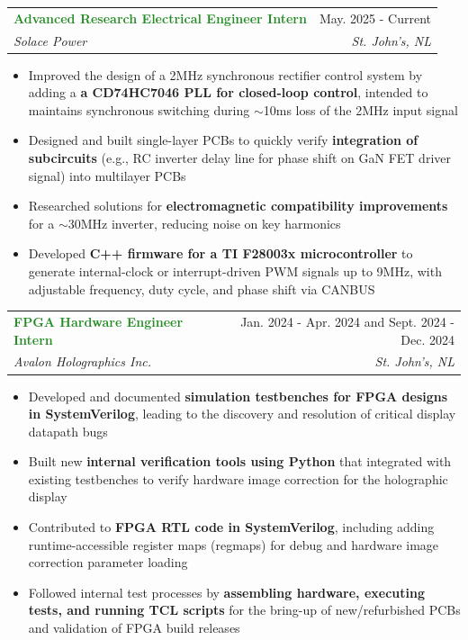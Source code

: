 \documentclass[letterpaper,11pt]{article}
\makeatletter
\newcommand{\resumeItem}[1]{
  \item\small{
    {#1 \vspace{-2pt}}
  }
}
\newcommand{\resumeSubheading}[4]{
  \vspace{-2pt}\item
    \begin{tabular*}{0.97\textwidth}[t]{l@{\extracolsep{\fill}}r}
      \textbf{\textcolor{ForestGreen}{#1}} & #2 \\
      \textit{\small#3} & \textit{\small #4} \\
    \end{tabular*}\vspace{-7pt}
}
\newcommand{\resumeItemListStart}{\begin{itemize}}
\newcommand{\resumeItemListEnd}{\end{itemize}\vspace{-5pt}}
\makeatother
\begin{document}
    \resumeSubheading
      {Advanced Research Electrical Engineer Intern}{May. 2025 - Current}
      {Solace Power}{St. John's, NL}
      \resumeItemListStart
        \resumeItem{Improved the design of a 2MHz synchronous rectifier control system by adding a \textbf{a CD74HC7046 PLL for closed-loop control}, intended to maintains synchronous 
        switching during \(\sim \)10ms loss of the 2MHz input signal}
        \resumeItem{Designed and built single-layer PCBs to quickly verify \textbf{integration of subcircuits} (e.g., RC inverter delay line for phase shift on GaN FET driver signal) into multilayer PCBs}
        \resumeItem{Researched solutions for \textbf{electromagnetic compatibility improvements} for a \(\sim \)30MHz inverter, reducing noise on key harmonics}
        \resumeItem{Developed \textbf{C++ firmware for a TI F28003x microcontroller} to generate internal-clock or interrupt-driven PWM signals up to 9MHz, 
                  with adjustable frequency, duty cycle, and phase shift via CANBUS}
      \resumeItemListEnd

    \resumeSubheading
      {FPGA Hardware Engineer Intern}{Jan. 2024 - Apr. 2024 and Sept. 2024 - Dec. 2024}
      {Avalon Holographics Inc.}{St. John's, NL}
      \resumeItemListStart
        \resumeItem{Developed and documented \textbf{simulation testbenches for FPGA designs in SystemVerilog}, leading to the discovery and resolution of 
                    critical display datapath bugs}
        \resumeItem{Built new \textbf{internal verification tools using Python} that integrated with existing testbenches to
                    verify hardware image correction for the holographic display}
        \resumeItem{Contributed to \textbf{FPGA RTL code in SystemVerilog}, including adding runtime-accessible register maps (regmaps) for debug and hardware
                    image correction parameter loading}
        \resumeItem{Followed internal test processes by \textbf{assembling hardware, executing tests, and running TCL scripts} 
                    for the bring-up of new/refurbished PCBs and validation of FPGA build releases}
      \resumeItemListEnd
\end{document}

